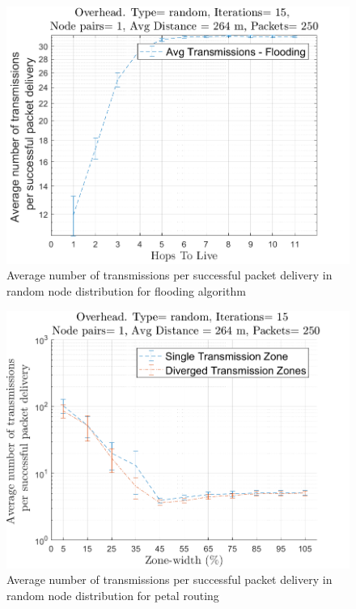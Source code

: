 \begin{figure}
\centering
\includegraphics[width=1\textwidth]{ncsuthesis-0.6/Appendix-A/figs/median_fl_trans_random.png}
\caption{Average number of transmissions per successful packet delivery in random node distribution for flooding algorithm}
\label{fig:med_fl_trans}
\end{figure}

\begin{figure}
\centering
\includegraphics[width=1\textwidth]{ncsuthesis-0.6/Appendix-A/figs/medianpe_trans_random.png}
\caption{Average number of transmissions per successful packet delivery in random node distribution for petal routing}
\label{fig:med_pe_trans}
\end{figure}


